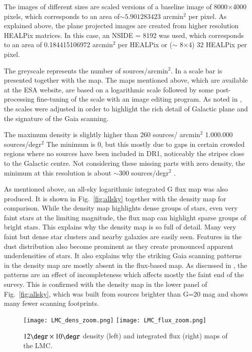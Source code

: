 \documentclass[longauth, final]{aa}
\begin{document}
The images of different sizes are scaled versions of a baseline image of  8000$\times$4000 pixels, which corresponds to an area of$\sim 5.901283423$ arcmin$^2$ per pixel. As explained above, the plane projected images are created from higher resolution HEALPix matrices. In this case, an NSIDE = 8192 was used, which corresponds to an area of 0.184415106972 arcmin$^2$ per HEALPix or ($\sim$ 8$\times$4) 32 HEALPix per pixel.

The greyscale represents the number of sources/arcmin$^2$. In \cite{2016A&A...595A...2G} a scale bar is presented together with the map. The maps mentioned above, which are available at the ESA website, are based on a logarithmic scale followed by some post-processing fine-tuning of the scale with an image editing program.
As noted in \cite{2016A&A...595A...2G}, the scales were adjusted in order to highlight  the rich detail of Galactic plane and the signature of the Gaia scanning.

The maximum density is slightly higher than 260 sources/ arcmin$^2$ 1.000.000 sources/degr$^2$ 
The minimum is 0, but this mostly due to gaps in certain crowded regions where no sources have been included in DR1,  noticeably the stripes close to the Galactic centre. Not considering these missing parts with zero density, the minimum at this resolution is about $\sim$300 sources/degr$^2$ .


As mentioned above, an all-sky logarithmic integrated G flux map was also produced. It is shown in Fig.~\ref{fig:allsky} together with the density map for comparison. 
While the density map highlights dense groups of stars, even  very faint stars at the limiting magnitude, the flux map can highlight sparse groups of bright stars.
This explains why the density map is so full of detail. Many very faint but dense star clusters and nearby galaxies are easily seen. Features in the dust distribution also become prominent as they create pronounced apparent underdensities of stars. 
It also explains why the striking Gaia scanning patterns in the density map are mostly absent in the flux-based map. As discussed  in \cite{2016A&A...595A...2G}, the patterns are an effect of incompleteness which affects mostly the faint end of the survey. This is confirmed with the density map in the lower panel of Fig.~\ref{fig:allsky}, which was built from sources brighter than G=20 mag and shows many fewer scanning footprints. 

\begin{figure*}[!htbp]
\centering
    \texttt{[image: LMC\_dens\_zoom.png]}
    \texttt{[image: LMC\_flux\_zoom.png]}
  \caption{$12\degr\times 10\degr$ density (left) and integrated flux (right) maps of the LMC.}\label{fig:lmc}
\end{figure*}
\end{document}
